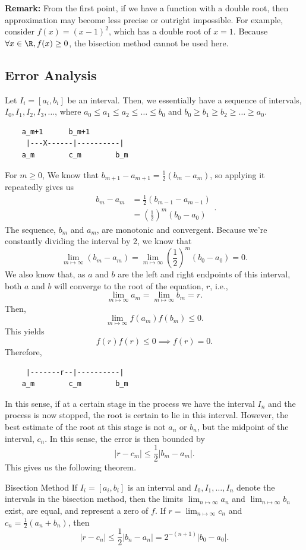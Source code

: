 \documentclass[letterpaper]{article}
\begin{document}
\textbf{Remark:} From the first point, if we have a function with a double root, then approximation may become less precise or outright impossible. For example, consider $f(x) = (x - 1)^2$, which has a double root of $x = 1$. Because $\forall x \in \R, f(x) \geq 0$, the bisection method cannot be used here.

\subsection{Error Analysis}
Let $I_i = [a_i, b_i]$ be an interval. Then, we essentially have a sequence of intervals, $I_0, I_1, I_2, I_3, \hdots$, where $a_0 \leq a_1 \leq a_2 \leq \hdots \leq b_0$ and $b_0 \geq b_1 \geq b_2 \geq \hdots \geq a_0$.

\begin{verbatim}
    a_m+1      b_m+1
     |---X------|----------|
    a_m        c_m        b_m \end{verbatim}
For $m \geq 0$, We know that $b_{m + 1} - a_{m + 1} = \frac{1}{2}(b_m - a_m)$, so applying it repeatedly gives us 
\[\begin{aligned}
    b_m - a_m &= \frac{1}{2}(b_{m -1} - a_{m - 1}) \\ 
        &= \left(\frac{1}{2}\right)^m (b_0 - a_0)
\end{aligned}.\]
The sequence, $b_m$ and $a_m$, are monotonic and convergent. Because we're constantly dividing the interval by 2, we know that 
\[\lim_{m \mapsto \infty} (b_m - a_m) = \lim_{m \mapsto \infty} \left(\frac{1}{2}\right)^m (b_0 - a_0) = 0.\]
We also know that, as $a$ and $b$ are the left and right endpoints of this interval, both $a$ and $b$ will converge to the root of the equation, $r$, i.e.,
\[\lim_{m \mapsto \infty} a_m = \lim_{m \mapsto \infty} b_m = r.\]
Then, 
\[\lim_{m \mapsto \infty} f(a_m) f(b_m) \leq 0.\] 
This yields \[f(r) f(r) \leq 0 \implies f(r) = 0.\]
Therefore,
\begin{verbatim}
     |-------r--|----------|
    a_m        c_m        b_m \end{verbatim}
In this sense, if at a certain stage in the process we have the interval $I_n$ and the process is now stopped, the root is certain to lie in this interval. However, the best estimate of the root at this stage is not $a_n$ or $b_n$, but the midpoint of the interval, $c_n$. In this sense, the error is then bounded by 
\[|r - c_m| \leq \frac{1}{2}|b_m - a_m|.\]
This gives us the following theorem. 
\begin{theorem}{Bisection Method}{}
    If $I_i = [a_i, b_i]$ is an interval and $I_0, I_1, \hdots, I_n$ denote the intervals in the bisection method, then the limits $\lim_{n \mapsto \infty} a_n$ and $\lim_{n \mapsto \infty} b_n$ exist, are equal, and represent a zero of $f$. If $r = \lim_{n \mapsto \infty} c_n$ and $c_n = \frac{1}{2} (a_n + b_n)$, then 
    \[|r - c_n| \leq \frac{1}{2}|b_n - a_n| = 2^{-(n + 1)}|b_0 - a_0|. \]
\end{theorem}
\end{document}
